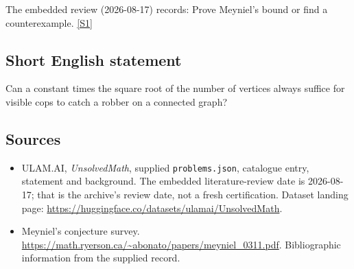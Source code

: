 \documentclass[11pt,a4paper]{article}
\newcommand{\sref}[2]{\hyperlink{source:#1:#2}{[S#2]}}
\begin{document}
The embedded review (2026-08-17) records: Prove Meyniel's bound or find a counterexample. \sref{statement}{1}

\subsection{Short English statement}

Can a constant times the square root of the number of vertices always suffice for visible cops to catch a robber on a connected graph?

\subsection{Sources}

{\small

\begin{itemize}

\item[\hypertarget{source:statement:1}{S1}] ULAM.AI, \emph{UnsolvedMath}, supplied \texttt{problems.json}, catalogue entry, statement and background. The embedded literature-review date is 2026-08-17; that is the archive’s review date, not a fresh certification. Dataset landing page: \url{https://huggingface.co/datasets/ulamai/UnsolvedMath}.

\item[\hypertarget{source:statement:2}{S2}] Meyniel's conjecture survey. \url{https://math.ryerson.ca/~abonato/papers/meyniel_0311.pdf}. Bibliographic information from the supplied record.

\end{itemize}

}

\label{end:statement}
\end{document}
